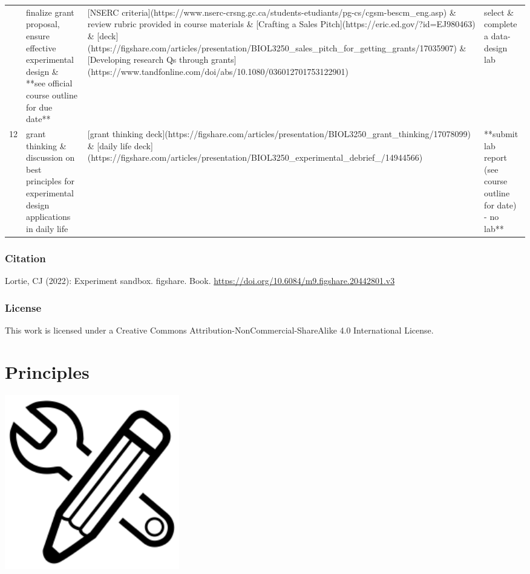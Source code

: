 \documentclass[
]{book}
\begin{document}
\begin{tabular}{rlll}
\addlinespace
11 & finalize grant proposal, ensure effective experimental design \& **see official course outline for due date** & {}[NSERC criteria](https://www.nserc-crsng.gc.ca/students-etudiants/pg-cs/cgsm-bescm\_eng.asp) \& review rubric provided in course materials \& [Crafting a Sales Pitch](https://eric.ed.gov/?id=EJ980463) \& [deck](https://figshare.com/articles/presentation/BIOL3250\_sales\_pitch\_for\_getting\_grants/17035907) \& [Developing research Qs through grants](https://www.tandfonline.com/doi/abs/10.1080/036012701753122901) & select \& complete a data-design lab\\
12 & grant thinking \& discussion on best principles for experimental design applications in daily life & {}[grant thinking deck](https://figshare.com/articles/presentation/BIOL3250\_grant\_thinking/17078099) \& [daily life deck](https://figshare.com/articles/presentation/BIOL3250\_experimental\_debrief\_/14944566) & **submit lab report (see course outline for date) - no lab**\\
\bottomrule
\end{tabular}

\hypertarget{citation}{%
\subsection*{Citation}\label{citation}}

Lortie, CJ (2022): Experiment sandbox. figshare. Book. \url{https://doi.org/10.6084/m9.figshare.20442801.v3}

\hypertarget{license}{%
\subsection*{License}\label{license}}

This work is licensed under a Creative Commons Attribution-NonCommercial-ShareAlike 4.0 International License.

\hypertarget{principles}{%
\chapter{Principles}\label{principles}}

\includegraphics[width=3in,height=\textheight]{./design.png}
\end{document}
